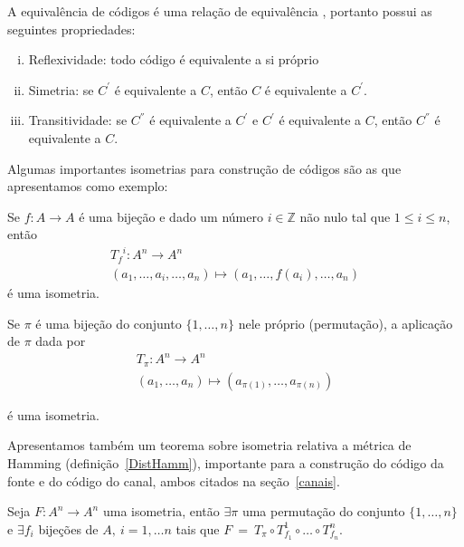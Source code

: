 A equivalência de códigos é uma relação de equivalência , portanto possui as seguintes propriedades:

\begin{property}
   \begin{enumerate}[(i)]
      \item Reflexividade: todo código é equivalente a si próprio
      \item Simetria: se $C^{'}$ é equivalente a $C$, então $C$ é equivalente a $C^{'}$.
      \item Transitividade: se $C^{''}$ é equivalente a $C^{'}$ e $C^{'}$ é equivalente a $C$, então $C^{''}$ é equivalente a $C$.
   \end{enumerate}
\end{property}

Algumas importantes isometrias para construção de códigos são as que apresentamos como exemplo:

\begin{example} Se $f: A \rightarrow A$ é uma bijeção e dado um número $i \in \mathbb{Z}$ não nulo tal que $1 \leq i \leq n$, então
   \begin{align*}
      {T_f}^i: A^n \rightarrow A^n\\
      (a_1, \ldots, a_i, \ldots , a_n) \mapsto (a_1, \ldots , f(a_i), \ldots, a_n) 
   \end{align*}
é uma isometria.
\end{example}

\begin{example} Se $\pi$ é uma bijeção do conjunto $\{ 1, \ldots , n\}$ nele próprio (permutação), a aplicação de $\pi$ dada por
   \begin{align*}
      T_{\pi}: A^n \rightarrow A^n\\
      (a_1, \ldots , a_n) \mapsto (a_{\pi(1)},  \ldots, a_{\pi(n)}) 
   \end{align*}
\end{example}
é uma isometria.

Apresentamos também um teorema sobre isometria relativa a métrica de Hamming (definição~\ref{DistHamm}), importante para a construção do código da fonte e do código do canal, ambos citados na seção~\ref{canais}. 

\begin{theorem} Seja $F: A^n \rightarrow A^n$ uma isometria, então $\exists \pi$ uma permutação do conjunto $\{ 1, \ldots , n\}$ e $\exists f_i$ bijeções de $A,\ i=1, \ldots n$ tais que $F\ =\ T_{\pi} \circ T_{f_{1}}^1 \circ \ldots \circ T_{f_{n}}^n$.
\end{theorem}

